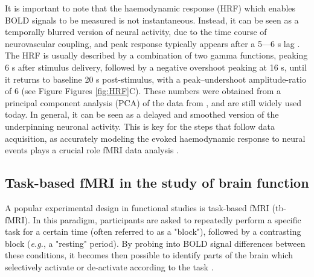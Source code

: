 It is important to note that the haemodynamic response (HRF) which enables BOLD signals to be measured is not instantaneous. Instead, it can be seen as a temporally blurred version of neural activity, due to the time course of neurovascular coupling, and peak response typically appears after a 5---6 s lag \citep{Menon2001,Logothetis2001}. The HRF is usually described by a combination of two gamma functions, peaking 6 s after stimulus delivery, followed by a negative overshoot peaking at 16 s, until it returns to baseline 20 s post-stimulus, with a peak–undershoot amplitude-ratio of 6 (see Figure Figures \ref{fig:HRF}C). These numbers were obtained from a principal component analysis (PCA) of the data from \citet{Friston1998}, and are still widely used today. In general, it can be seen as a delayed and smoothed version of the underpinning neuronal activity. This is key for the steps that follow data acquisition, as accurately modeling the evoked haemodynamic response to neural events plays a crucial role fMRI data analysis \citep{Lindquist2009}.










   
 




\subsection{Task-based fMRI in the study of brain function}

A popular experimental design in functional studies is task-based fMRI (tb-fMRI). In this paradigm, participants are asked to repeatedly perform a specific task for a certain time (often referred to as a "block"), followed by a contrasting block (\textit{e.g.}, a "resting" period). By probing into BOLD signal differences between these conditions, it becomes then possible to identify parts of the brain which selectively activate or de-activate according to the task \citep{Friston1995a}.

